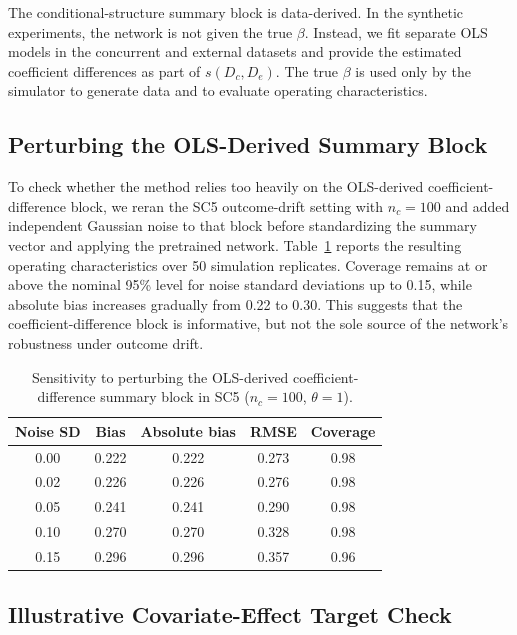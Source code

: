 The conditional-structure summary block is data-derived. In the synthetic
experiments, the network is not given the true $\beta$. Instead, we fit
separate OLS models in the concurrent and external datasets and provide the
estimated coefficient differences as part of $s(D_c,D_e)$. The true
$\beta$ is used only by the simulator to generate data and to evaluate
operating characteristics.

\subsection{Perturbing the OLS-Derived Summary Block}
\label{app:ols-perturbation}

To check whether the method relies too heavily on the OLS-derived
coefficient-difference block, we reran the SC5 outcome-drift setting with
$n_c=100$ and added independent Gaussian noise to that block before
standardizing the summary vector and applying the pretrained network.
Table~\ref{tab:ols-perturbation} reports the resulting operating
characteristics over 50 simulation replicates. Coverage remains at or above
the nominal 95\% level for noise standard deviations up to 0.15, while
absolute bias increases gradually from 0.22 to 0.30. This suggests that the
coefficient-difference block is informative, but not the sole source of the
network's robustness under outcome drift.

\begin{table}[H]
\centering
\small
\caption{Sensitivity to perturbing the OLS-derived coefficient-difference
summary block in SC5 ($n_c=100$, $\theta=1$).}
\label{tab:ols-perturbation}
\begin{tabular}{ccccc}
\toprule
Noise SD & Bias & Absolute bias & RMSE & Coverage \\
\midrule
0.00 & 0.222 & 0.222 & 0.273 & 0.98 \\
0.02 & 0.226 & 0.226 & 0.276 & 0.98 \\
0.05 & 0.241 & 0.241 & 0.290 & 0.98 \\
0.10 & 0.270 & 0.270 & 0.328 & 0.98 \\
0.15 & 0.296 & 0.296 & 0.357 & 0.96 \\
\bottomrule
\end{tabular}
\end{table}

\subsection{Illustrative Covariate-Effect Target Check}
\label{app:covariate-effect}

